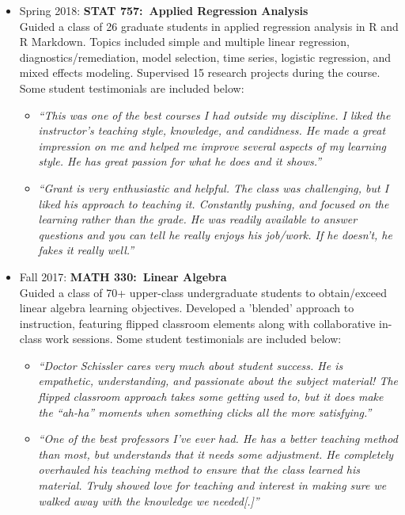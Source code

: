 \documentclass[paper=a4,fontsize=11pt]{scrartcl} %
\newcommand{\CourseEntry}[3]{
		\noindent \item{#1: \textbf{#2} \\ #3}}
\begin{document}
\begin{itemize}[noitemsep]
\CourseEntry{Spring 2018}{STAT 757:~Applied Regression Analysis}{Guided a class of 26 graduate students in applied regression analysis in R and R Markdown. Topics included simple and multiple linear regression, diagnostics/remediation, model selection, time series, logistic regression, and mixed effects modeling. Supervised 15 research projects during the course. Some student testimonials are included below:
\begin{itemize}
\item \emph{\small{``This was one of the best courses I had outside my discipline. I liked the instructor's teaching style, knowledge, and candidness. He made a great impression on me and helped me improve several aspects of my learning style. He has great passion for what he does and it shows.''}}
\item \emph{\small{``Grant is very enthusiastic and helpful. The class was challenging, but I liked his approach to teaching it. Constantly pushing, and focused
on the learning rather than the grade. He was readily available to answer questions and you can tell he really enjoys his job/work. If he doesn't, he fakes it really well.''}}
\end{itemize}
}{} 

\CourseEntry{Fall 2017}{MATH 330:~Linear Algebra}{Guided a class of 70+ upper-class undergraduate students to obtain/exceed linear algebra learning objectives. Developed a 'blended' approach to instruction, featuring flipped classroom elements along with collaborative in-class work sessions. Some student testimonials are included below:
\begin{itemize}
\item \emph{\small{``Doctor Schissler cares very much about student success. He is empathetic, understanding, and passionate about the subject material! The flipped classroom approach takes some getting used to, but it does make the ``ah-ha'' moments when something clicks all the more satisfying.''}}
\item \emph{\small{``One of the best professors I've ever had. He has a better teaching method than most, but understands that it needs some adjustment.
He completely overhauled his teaching method to ensure that the class learned his material. Truly showed love for teaching and interest in making sure we walked away with the knowledge we needed[.]''}}
\end{itemize}
}{}

\end{itemize}
\end{document}
